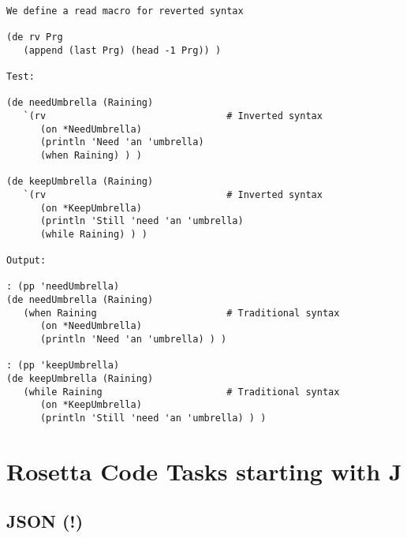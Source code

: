\begin{verbatim}

We define a read macro for reverted syntax

(de rv Prg
   (append (last Prg) (head -1 Prg)) )

Test:

(de needUmbrella (Raining)
   `(rv                                # Inverted syntax
      (on *NeedUmbrella)
      (println 'Need 'an 'umbrella)
      (when Raining) ) )

(de keepUmbrella (Raining)
   `(rv                                # Inverted syntax
      (on *KeepUmbrella)
      (println 'Still 'need 'an 'umbrella)
      (while Raining) ) )

Output:

: (pp 'needUmbrella)
(de needUmbrella (Raining)
   (when Raining                       # Traditional syntax
      (on *NeedUmbrella)
      (println 'Need 'an 'umbrella) ) )

: (pp 'keepUmbrella)
(de keepUmbrella (Raining)
   (while Raining                      # Traditional syntax
      (on *KeepUmbrella)
      (println 'Still 'need 'an 'umbrella) ) )

\end{verbatim}

\chapter{Rosetta Code Tasks starting with J}

\section*{JSON (!)}

